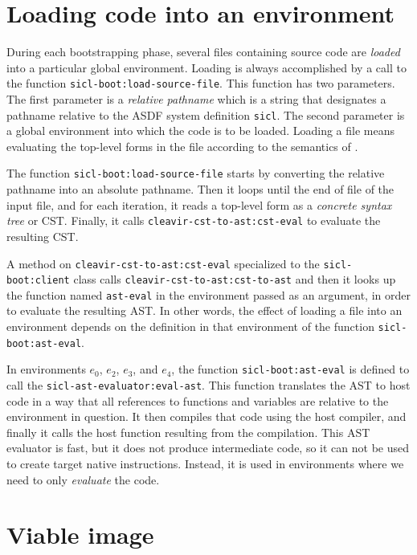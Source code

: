 \section{Loading code into an environment}

During each bootstrapping phase, several files containing \sysname{}
source code are \emph{loaded} into a particular global environment.
Loading is always accomplished by a call to the function
\texttt{sicl-boot:load-source-file}.  This function has two
parameters.  The first parameter is a \emph{relative pathname} which
is a string that designates a pathname relative to the ASDF system
definition \texttt{sicl}.  The second parameter is a global
environment into which the code is to be loaded.  Loading a file means
evaluating the top-level forms in the file according to the semantics
of \commonlisp{}.

The function \texttt{sicl-boot:load-source-file} starts by converting
the relative pathname into an absolute pathname.  Then it loops until
the end of file of the input file, and for each iteration, it reads a
top-level form as a \emph{concrete syntax tree} or CST.  Finally, it
calls \texttt{cleavir-cst-to-ast:cst-eval} to evaluate the resulting
CST.

A method on \texttt{cleavir-cst-to-ast:cst-eval} specialized to the
\texttt{sicl-boot:client} class calls
\texttt{cleavir-cst-to-ast:cst-to-ast} and then it looks up the
function named \texttt{ast-eval} in the environment passed as an
argument, in order to evaluate the resulting AST.  In other words,
the effect of loading a file into an environment depends on the
definition in that environment of the function
\texttt{sicl-boot:ast-eval}.

In environments $e_0$, $e_2$, $e_3$, and $e_4$, the function
\texttt{sicl-boot:ast-eval} is defined to call the
\texttt{sicl-ast-evaluator:eval-ast}.  This function translates the
AST to host code in a way that all references to functions and
variables are relative to the environment in question.  It then
compiles that code using the host compiler, and finally it calls the
host function resulting from the compilation.  This AST evaluator is
fast, but it does not produce intermediate code, so it can not be used
to create target native instructions.  Instead, it is used in
environments where we need to only \emph{evaluate} the code.

\section{Viable image}
\label{sec-bootstrapping-viable-image}

